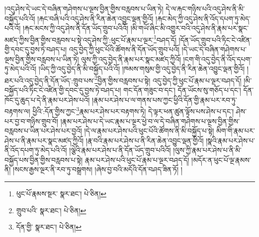 །འདུ་ཤེས་དེ་ཡང་དེ་བཞིན་གཤེགས་པ་ལྔས་བྱིན་གྱིས་བརླབས་པ་ཡིན་ཏེ། དེ་ལ་རྐང་གཉིས་པའི་འདུ་ཤེས་ནི་མི་བསྐྱོད་པའི་འོ། །རྐང་བཞི་པའི་འདུ་ཤེས་ནི་རིན་ཆེན་འབྱུང་ལྡན་གྱིའོ། །རྐང་མེད་ཀྱི་འདུ་ཤེས་ནི་འོད་དཔག་ཏུ་མེད་པའི་འོ། །རྐང་མངས་ཀྱི་འདུ་ཤེས་ནི་དོན་ཡོད་གྲུབ་པའིའོ། །མི་གཡོ་ཞིང་མི་འགྱུར་བའི་འདུ་ཤེས་ནི་རྣམ་པར་སྣང་མཛད་ཀྱིས་བྱིན་གྱིས་བརླབས་པ་སྟེ་འདུ་ཤེས་ཀྱི་:ཕུང་པོ་རྣམ་པ་ལྔར་\footnote{ཕུང་པོ་རྣམས་སྔར་  སྣར་ཐང་།  པེ་ཅིན། }བཤད་དོ། །དོན་ཡོད་གྲུབ་པའི་ཏིང་ངེ་འཛིན་གྱི་དབང་དུ་བྱས་ཏེ་བཤད་པ། འདུ་བྱེད་ཀྱི་ཕུང་པོའི་ཚོགས་ནི་དོན་ཡོད་གྲུབ་པའོ། །དེ་ཡང་དེ་བཞིན་གཤེགས་པ་ལྔས་བྱིན་གྱིས་བརླབས་པ་ཡིན་ཏེ། ལུས་ཀྱི་འདུ་བྱེད་ནི་རྣམ་པར་སྣང་མཛད་ཀྱིའོ། །ངག་གི་འདུ་བྱེད་ནི་འོད་དཔག་ཏུ་མེད་པའི་འོ། །ཡིད་ཀྱི་འདུ་བྱེད་ནི་མི་བསྐྱོད་པའི་འོ། །ཁམས་གསུམ་གྱི་འདུ་བྱེད་ནི་རིན་ཆེན་འབྱུང་ལྡན་གྱིའོ། །ཐར་པའི་འདུ་བྱེད་ནི་དོན་ཡོད་:གྲུབ་པས་\footnote{གྲུབ་པའི་  སྣར་ཐང་།  པེ་ཅིན། }བྱིན་གྱིས་བརླབས་པ་སྟེ། འདུ་བྱེད་ཀྱི་ཕུང་པོ་རྣམ་པ་ལྔར་བཤད་དོ། །མི་བསྐྱོད་པའི་ཏིང་ངེ་འཛིན་གྱི་དབང་དུ་བྱས་ཏེ་བཤད་པ། གང་དོན་གཟུང་བ་དང་། དོན་ཡོངས་སུ་གཅོད་པ་དང་། དོན་ཁོང་དུ་ཆུད་པ་དེ་ནི་རྣམ་པར་ཤེས་པའོ། །རྣམ་པར་ཤེས་པ་ལ་གནས་པས་ཀྱང་ཕྱིའི་དོན་གྱི་རྣམ་པར་རབ་ཏུ་བརྟགས་ལ། ཕྱིའི་:དོན་གྱིས་ཀྱང་\footnote{དོན་གྱི་  སྣར་ཐང་།  པེ་ཅིན། }རྣམ་པར་ཤེས་པར་བརྟགས་ཏེ། དེ་ལྟར་ཕན་ཚུན་ལྟོས་པས་ཤེས་པ་དང་། ཤེས་པར་བྱ་བ་གཉིས་གྲུབ་བོ། །རྣམ་པར་ཤེས་པ་དེ་ཡང་རྣམ་པ་ལྔར་ཕྱེ་བ་ལ་དེ་བཞིན་གཤེགས་པ་ལྔས་བྱིན་གྱིས་བརླབས་པ་ཡིན་པར་ཤེས་པར་བྱའོ། །དེ་ལ་རྣམ་པར་ཤེས་པའི་ཕུང་པོའི་ཚོགས་ནི་མི་བསྐྱོད་པ་སྟེ། མིག་གི་རྣམ་པར་ཤེས་པ་ནི་རྣམ་པར་སྣང་མཛད་ཀྱིའོ། །རྣ་བའི་རྣམ་པར་ཤེས་པ་ནི་རིན་ཆེན་འབྱུང་ལྡན་གྱིའོ། །སྣའི་རྣམ་པར་ཤེས་པ་ནི་འོད་དཔག་ཏུ་མེད་པའི་འོ། །ལྕེའི་རྣམ་པར་ཤེས་པ་ནི་དོན་ཡོད་གྲུབ་པའིའོ། །ལུས་ཀྱི་རྣམ་པར་ཤེས་པ་ནི་མི་བསྐྱོད་པས་བྱིན་གྱིས་བརླབས་པ་སྟེ། རྣམ་པར་ཤེས་པའི་ཕུང་པོ་རྣམ་པ་ལྔར་བཤད་དོ། །མདོར་ན་ཕུང་པོ་ལྔ་རྣམས་ནི། །སངས་རྒྱས་ལྔར་ནི་རབ་ཏུ་བསྒྲགས། །ཞེས་བྱ་བའི་མདོའི་དོན་བཤད་ཟིན་ཏོ། །
